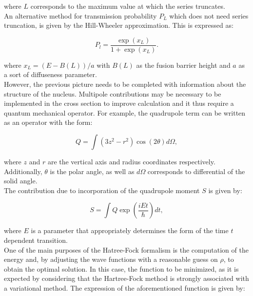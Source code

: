 \documentclass[openany]{book}
\begin{document}
where $L$ corresponds to the maximum value at which the series truncates. \\

An alternative method for transmission probability $P_L$ which does not need series truncation, is given by the Hill-Wheeler approximation. This is expressed as: 

\begin{equation} \label{micro_TDHF_fusion_crossSectionEven}
	P_l = \frac{\exp {(x_L)}}{1 + \exp {(x_L)}}.
\end{equation}

where $x_L = (E - B(L))/a$ with $B(L)$ as the fusion barrier height and $a$ as a sort of diffuseness parameter.  \\

However, the previous picture needs to be completed with information about the structure of the nucleus. Multipole contributions may be necessary to be implemented in the cross section to improve calculation and it thus require a quantum mechanical operator. For example,  the quadrupole term can be written as an operator with the form:

\begin{equation}\label{micro_TDHF_quadrupole}
	Q = \int (3z^2 - r^2) \cos (2\theta) d\Omega,
\end{equation}

where $z$ and $r$ are the vertical axis and radius coordinates respectively. Additionally, $\theta$ is the polar angle, as well as $d\Omega$ corresponds to differential of the solid angle.  \\

The contribution due to incorporation of the quadrupole moment $S$ is given by:

\begin{equation}\label{micro_TDHF_quadrupole_calculation}
	S = \int Q  \exp{\left( \frac{iEt}{\hbar }\right)}dt, 
\end{equation}

where $E$ is a parameter that appropriately determines the form of the time $t$ dependent transition. \\ 

One of the main purposes of the Hatree-Fock formalism is the computation of the energy and, by adjusting the wave functions with a reasonable guess on $\rho$, to obtain the optimal solution. In this case,  the function to be minimized, as it is expected by considering that the Hartree-Fock method is strongly associated with a variational method. The expression of the aforementioned function is given by:
\end{document}
